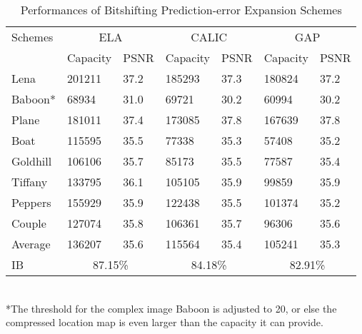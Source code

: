\documentclass[journal]{IEEEtran}
\begin{document}
\begin{table}[t]
    \centering
    \caption{\label{tbl:ibresults}Performances of Bitshifting Prediction-error Expansion Schemes}
    \setlength{\tabcolsep}{1.6mm}
    \begin{tabular}{lllllll}\hline\hline
      Schemes & \multicolumn{2}{c}{ELA} & \multicolumn{2}{c}{CALIC} & \multicolumn{2}{c}{GAP} \\
	 & Capacity & PSNR & Capacity & PSNR & Capacity & PSNR \\\hline
	Lena	& 201211 & 37.2 & 185293 & 37.3 & 180824 & 37.2 \\
	Baboon*	& 68934 & 31.0 & 69721 & 30.2 & 60994 & 30.2 \\
	Plane	& 181011 & 37.4 & 173085 & 37.8 & 167639 & 37.8 \\
	Boat	& 115595 & 35.5 & 77338 & 35.3 & 57408 & 35.2 \\
	Goldhill& 106106 & 35.7 & 85173 & 35.5 & 77587 & 35.4 \\
	Tiffany	& 133795 & 36.1 & 105105 & 35.9 & 99859 & 35.9 \\
	Peppers	& 155929 & 35.9 & 122438 & 35.5 & 101374 & 35.2 \\
	Couple	& 127074 & 35.8 & 106361 & 35.7 & 96306 & 35.6 \\
	Average	& 136207 & 35.6 & 115564 & 35.4 & 105241 & 35.3 \\
	IB & \multicolumn{2}{c}{87.15\%} & \multicolumn{2}{c}{84.18\%} & \multicolumn{2}{c}{82.91\%} \\\hline\hline
    \end{tabular}\\[0.5ex]
    *The threshold for the complex image Baboon is adjusted to 20, or else the compressed location
    map is even larger than the capacity it can provide.
\end{table}
\end{document}

